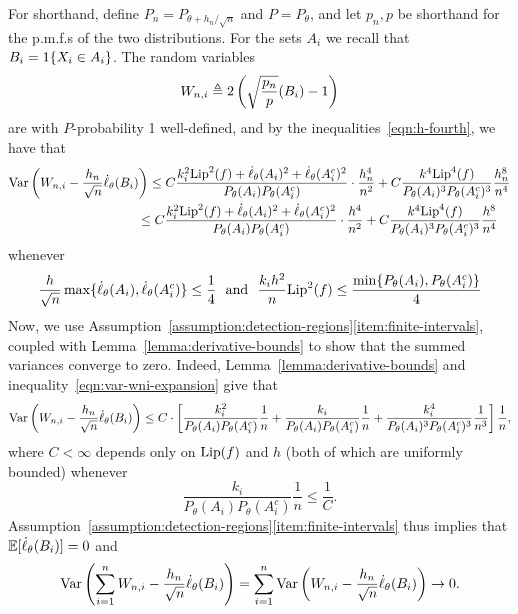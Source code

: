 For shorthand, define $P_n = P_{\theta + h_n / \sqrt{n}}$ and $P =
P_\theta$, and let $p_n, p$ be shorthand for the p.m.f.s of the two
distributions.  For the sets $A_i$ we recall that $B_i = 1\!\left\{X_i \in
  A_i\right\}$.  The random variables
\begin{equation*}
  W_{n,i} \triangleq 2 \left(\sqrt{\frac{p_n}{p}}(B_i) - 1\right)
\end{equation*}
are with $P$-probability 1 well-defined, and by the
inequalities~\eqref{eqn:h-fourth}, we have
that
\begin{align}
  \lefteqn{\var\left(W_{n,i} - \frac{h_n}{\sqrt{n}} \score_\theta(B_i)\right)
    \le 
    C \frac{k_i^2 \lip^2(f) + \score_\theta(A_i)^2
      + \score_\theta(A_i^c)^2}{P_\theta(A_i) P_\theta(A_i^c)}
    \cdot \frac{h_n^4}{n^2}
    + C \frac{k^4 \lip^4(f)}{
      P_\theta(A_i)^3 P_\theta(A_i^c)^3}
    \frac{h_n^8}{n^4}} \nonumber \\
  & \qquad\qquad\qquad\qquad\qquad \le 
  C \frac{k_i^2 \lip^2(f) + \score_\theta(A_i)^2
  + \score_\theta(A_i^c)^2}{P_\theta(A_i) P_\theta(A_i^c)}
  \cdot \frac{h^4}{n^2}
  + C \frac{k^4 \lip^4(f)}{
    P_\theta(A_i)^3 P_\theta(A_i^c)^3}
  \frac{h^8}{n^4}
  \label{eqn:var-wni-expansion}
\end{align}
whenever
\begin{equation*}
  \frac{h}{\sqrt{n}} \max\{\dot{\ell}_\theta(A_i),
  \dot{\ell}_\theta(A_i^c)\}
  \le \frac{1}{4}
  ~~ \mbox{and} ~~
  \frac{k_i h^2}{n} {\rm \textup{Lip}}^2(f)
  \le \frac{\min\{P_\theta(A_i), P_\theta(A_i^c)\}}{4}
\end{equation*}
Now, we use
Assumption~\ref{assumption:detection-regions}\eqref{item:finite-intervals},
coupled with Lemma~\ref{lemma:derivative-bounds} to show that the summed
variances converge to zero.  Indeed, Lemma~\ref{lemma:derivative-bounds} and
inequality~\eqref{eqn:var-wni-expansion} give that
\begin{equation*}
  \textup{Var}\left(W_{n,i} - \frac{h_n}{\sqrt{n}} \dot{\ell}_\theta(B_i)\right)
  \le C \cdot
  \left[\frac{k_i^2}{P_\theta(A_i) P_\theta(A_i^c)}
    \frac{1}{n}
    + \frac{k_i}{P_\theta(A_i) P_\theta(A_i^c)}
    \frac{1}{n}
    + \frac{k_i^4}{P_\theta(A_i)^3 P_\theta(A_i^c)^3}
    \frac{1}{n^3}\right] \frac{1}{n},
\end{equation*}
where $C < \infty$ depends only on ${\rm \textup{Lip}}(f)$ and $h$ (both of which are
uniformly bounded) whenever
\begin{equation*}
  \frac{k_i}{P_\theta(A_i) P_\theta(A_i^c)} \frac{1}{n} \le
  \frac{1}{C}.
\end{equation*}
Assumption~\ref{assumption:detection-regions}\eqref{item:finite-intervals}
thus implies that $\mathbb{E}[\dot{\ell}_\theta(B_i)] = 0$ and
\begin{equation}
  \label{eqn:summed-variances-to-zero}
  \textup{Var}\left(\sum_{i = 1}^n W_{n,i} - \frac{h_n}{\sqrt{n}} \dot{\ell}_\theta(B_i)
  \right)
  = \sum_{i = 1}^n \textup{Var}\left(W_{n,i} - \frac{h_n}{\sqrt{n}} \dot{\ell}_\theta(B_i)
  \right)
  \to 0.
\end{equation}

